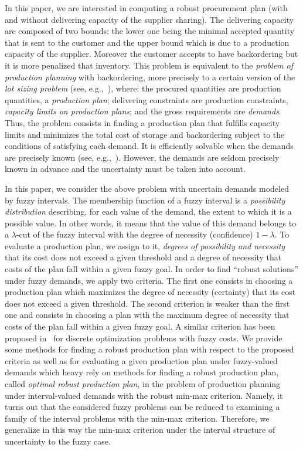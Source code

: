 \documentclass[11pt]{article}
\begin{document}
In this paper, we are interested in  computing
a robust procurement plan (with and without delivering capacity
of the supplier sharing). The delivering capacity are composed of
two bounds: the lower one being  the minimal accepted quantity
that is sent to the customer and the upper bound which is due to a
production capacity of the supplier. Moreover the customer
accepts to have backordering but it is more penalized that
inventory.
This problem is equivalent to the \emph{problem of production
planning} with backordering, more precisely to a certain version of
the \emph{lot sizing problem} (see, e.g.,~\cite{WW58,FLK80}),   where: the procured quantities are
production quantities, a \emph{production plan}; delivering constraints are production
constraints, \emph{capacity limits on production plans}; and the gross requirements are  \emph{demands}.
Thus, the problem consists in
finding a  production plan  that 
fulfills capacity limits and 
 minimizes the total cost of storage and backordering subject to the conditions of satisfying each demand.
It is efficiently
solvable when the demands are precisely
known (see, e.g.,~\cite{DK97,KGW03,AH08}).
However, the demands are seldom precisely known in advance
and the uncertainty must be taken into account.

In this paper, we consider the above problem
with uncertain demands modeled by fuzzy intervals. The membership function
of a fuzzy interval  is a \emph{possibility distribution}
describing, for each value of the demand, the extent
to which it is a possible value. 
In other words, it means that
the value of this demand belongs to a $\lambda$-cut of the fuzzy interval 
with the degree of necessity (confidence)
$1-\lambda$. 
To evaluate  a production plan, we assign to it,
 \emph{degrees of possibility and
necessity} that  its cost does not exceed a given threshold and
a degree of necessity
that costs of the plan fall within 
a given fuzzy goal.
In order to find ``robust solutions'' under fuzzy demands,
we apply two criteria.
The first one consists in choosing
 a production plan
which maximizes 
the degree of necessity (certainty)   that its cost does not exceed  a given threshold.
The second criterion is
weaker than the first one and consists   
in choosing a plan with
 the maximum degree of necessity
that costs of the plan fall within 
a given fuzzy goal. A similar criterion has been proposed in~\cite{KK09} for
discrete optimization problems with fuzzy costs.
We provide some methods for finding a  robust production plan
 with respect to the proposed criteria as well as for evaluating a given production plan
under fuzzy-valued demands which heavy rely on methods for 
 finding a robust production plan, called 
\emph{optimal robust production plan}, in 
the problem of production
planning under interval-valued demands with the robust  min-max criterion.
Namely,
it turns out that  the considered fuzzy problems can be reduced to examining a family of the interval
problems with the min-max criterion. Therefore, we generalize in this way the  min-max criterion 
under the interval structure of uncertainty to the fuzzy   case.
\end{document}
